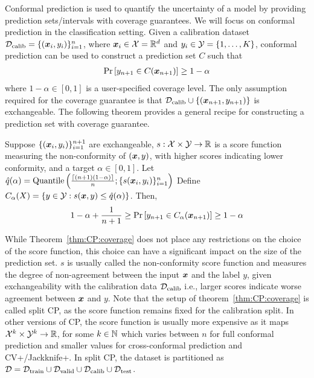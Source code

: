 Conformal prediction is used to quantify the uncertainty of a model by providing prediction sets/intervals with coverage guarantees.
We will focus on conformal prediction in the classification setting.
Given a calibration dataset $\mathcal{D_{\mathrm{calib}}} = \{({\bm{x}}_i, y_i)\}_{i=1}^n$, where ${\bm{x}}_i \in {\mathcal{X}} = \mathbb{R}^d$ and $y_i \in {\mathcal{Y}} = \{1, \dots, K\}$, conformal prediction can be used to construct a prediction set $C$ such that
\begin{align*}
    \Pr\left[y_{n+1} \in C({\bm{x}}_{n+1}) \right] \geq 1 - \alpha
\end{align*}
where $1 - \alpha \in [0, 1]$ is a user-specified coverage level.
The only assumption required for the coverage guarantee is that $\mathcal{D_{\mathrm{calib}}} \cup \{({\bm{x}}_{n+1}, y_{n+1})\}$ is exchangeable.
The following theorem provides a general recipe for constructing a prediction set with coverage guarantee.
\begin{theorem}
    Suppose $\{({\bm{x}}_i, y_i)\}_{i=1}^{n+1}$ are exchangeable, $s: {\mathcal{X}} \times {\mathcal{Y}} \rightarrow \mathbb{R}$ is a score function measuring the non-conformity of $({\bm{x}}, y)$, with higher scores indicating lower conformity, and a target $\alpha \in [0, 1]$. %
    Let $\hat{q}(\alpha) = \text{Quantile}\left(\frac{\lceil(n+1)(1-\alpha)\rceil}{n}; \{s({\bm{x}}_i, y_i)\}_{i=1}^{n}\right)$
    Define $C_{\alpha}(X) = \{y \in {\mathcal{Y}}: s({\bm{x}}, y) \leq \hat{q}(\alpha)\}$.
    Then,
    \begin{align}
        1 - \alpha +\frac{1}{n+1} \geq \Pr\left[y_{n+1} \in C_{\alpha}({\bm{x}}_{n+1}) \right] \geq 1 - \alpha
        \label{eq:CP:coverage}
    \end{align}
    \label{thm:CP:coverage}
\end{theorem}

While Theorem~\ref{thm:CP:coverage} does not place any restrictions on the choice of the score function, this choice can have a significant impact on the size of the prediction set.
$s$ is usually called the non-conformity score function and measures the degree of non-agreement between the input ${\bm{x}}$ and the label $y$, given exchangeability with the calibration data $\mathcal{D_{\mathrm{calib}}}$ i.e., larger scores indicate worse agreement between ${\bm{x}}$ and $y$.
Note that the setup of theorem~\ref{thm:CP:coverage} is called split CP, as the score function remains fixed for the calibration split.
In other versions of CP, the score function is usually more expensive as it maps ${\mathcal{X}}^k \times {\mathcal{Y}}^k \rightarrow \mathbb{R}$, for some $k \in \mathbb{N}$ which varies between $n$ for full conformal prediction and smaller values for cross-conformal prediction and CV+/Jackknife+.
In split CP, the dataset is partitioned as $\mathcal{D} = {\mathcal{D}}_{\text{train}}\cup {\mathcal{D}}_{\text{valid}}\cup {\mathcal{D}}_{\text{calib}}\cup  {\mathcal{D}}_{\text{test}}$.

